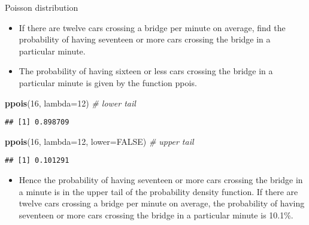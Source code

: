 \documentclass[
  ignorenonframetext,
]{beamer}
\newenvironment{Shaded}{\begin{snugshade}}{\end{snugshade}}
\newcommand{\CommentTok}[1]{\textcolor[rgb]{0.56,0.35,0.01}{\textit{#1}}}
\newcommand{\DataTypeTok}[1]{\textcolor[rgb]{0.13,0.29,0.53}{#1}}
\newcommand{\DecValTok}[1]{\textcolor[rgb]{0.00,0.00,0.81}{#1}}
\newcommand{\KeywordTok}[1]{\textcolor[rgb]{0.13,0.29,0.53}{\textbf{#1}}}
\newcommand{\NormalTok}[1]{#1}
\newcommand{\OtherTok}[1]{\textcolor[rgb]{0.56,0.35,0.01}{#1}}
\providecommand{\tightlist}{%
  \setlength{\itemsep}{0pt}\setlength{\parskip}{0pt}}
\begin{document}
\begin{frame}[fragile]{Poisson distribution}
\protect\hypertarget{poisson-distribution-1}{}

\begin{itemize}
\item
  If there are twelve cars crossing a bridge per minute on average, find
  the probability of having seventeen or more cars crossing the bridge
  in a particular minute.
\item
  The probability of having sixteen or less cars crossing the bridge in
  a particular minute is given by the function ppois.
\end{itemize}

\begin{Shaded}
\begin{Highlighting}[]
\KeywordTok{ppois}\NormalTok{(}\DecValTok{16}\NormalTok{, }\DataTypeTok{lambda=}\DecValTok{12}\NormalTok{)   }\CommentTok{# lower tail }
\end{Highlighting}
\end{Shaded}

\begin{verbatim}
## [1] 0.898709
\end{verbatim}

\begin{Shaded}
\begin{Highlighting}[]
\KeywordTok{ppois}\NormalTok{(}\DecValTok{16}\NormalTok{, }\DataTypeTok{lambda=}\DecValTok{12}\NormalTok{, }\DataTypeTok{lower=}\OtherTok{FALSE}\NormalTok{)   }\CommentTok{# upper tail }
\end{Highlighting}
\end{Shaded}

\begin{verbatim}
## [1] 0.101291
\end{verbatim}

\begin{itemize}
\tightlist
\item
  Hence the probability of having seventeen or more cars crossing the
  bridge in a minute is in the upper tail of the probability density
  function. If there are twelve cars crossing a bridge per minute on
  average, the probability of having seventeen or more cars crossing the
  bridge in a particular minute is 10.1\%.
\end{itemize}

\end{frame}
\end{document}
